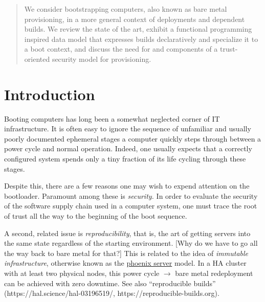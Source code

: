 \maketitle


\begin{abstract}

  We consider bootstrapping computers, also known as bare metal provisioning, in a more general context of deployments and dependent builds. We review the state of the art, exhibit a functional programming inspired data model that expresses builds declaratively and specialize it to a boot context, and discuss the need for and components of a trust-oriented security model for provisioning.

\end{abstract}

\section{Introduction}

Booting computers has long been a somewhat neglected corner of IT infrastructure. 
%
It is often easy to ignore the sequence of unfamiliar and usually poorly documented ephemeral stages a computer quickly steps through between a power cycle and normal operation. 
%
Indeed, one usually expects that a correctly configured system spends only a tiny fraction of its life cycling through these stages.

Despite this, there are a few reasons one may wish to expend attention on the bootloader. 
%
Paramount among these is \emph{security.} 
%
In order to evaluate the security of the software supply chain used in a computer system, one must trace the root of trust all the way to the beginning of the boot sequence.

A second, related issue is \emph{reproducibility}, that is, the art of getting servers into the same state regardless of the starting environment. {[}Why do we have to go all the way back to bare metal for
that?{]} 
%
This is related to the idea of \emph{immutable infrastructure},
otherwise known as the
\href{https://martinfowler.com/bliki/PhoenixServer.html}{phoenix server}
model. In a HA cluster with at least two physical nodes, this power
cycle \(\rightarrow\) bare metal redeployment can be achieved with zero
downtime. See also ``reproducible builds''
(https://hal.science/hal-03196519/, https://reproducible-builds.org).

